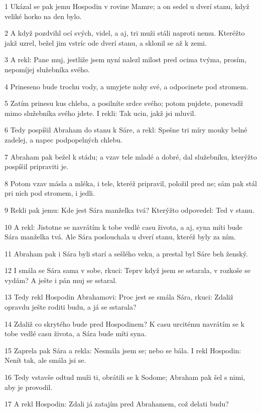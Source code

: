 \par 1 Ukázal se pak jemu Hospodin v rovine Mamre; a on sedel u dverí stanu, když veliké horko na den bylo.
\par 2 A když pozdvihl ocí svých, videl, a aj, tri muži stáli naproti nemu. Kteréžto jakž uzrel, bežel jim vstríc ode dverí stanu, a sklonil se až k zemi.
\par 3 A rekl: Pane muj, jestliže jsem nyní nalezl milost pred ocima tvýma, prosím, nepomíjej služebníka svého.
\par 4 Prineseno bude trochu vody, a umyjete nohy své, a odpocinete pod stromem.
\par 5 Zatím prinesu kus chleba, a posilníte srdce svého; potom pujdete, ponevadž mimo služebníka svého jdete. I rekli: Tak ucin, jakž jsi mluvil.
\par 6 Tedy pospíšil Abraham do stanu k Sáre, a rekl: Spešne tri míry mouky belné zadelej, a napec podpopelných chlebu.
\par 7 Abraham pak bežel k stádu; a vzav tele mladé a dobré, dal služebníku, kterýžto pospíšil pripraviti je.
\par 8 Potom vzav másla a mléka, i tele, kteréž pripravil, položil pred ne; sám pak stál pri nich pod stromem, i jedli.
\par 9 Rekli pak jemu: Kde jest Sára manželka tvá? Kterýžto odpovedel: Ted v stanu.
\par 10 A rekl: Jistotne se navrátím k tobe vedlé casu života, a aj, syna míti bude Sára manželka tvá. Ale Sára poslouchala u dverí stanu, kteréž byly za ním.
\par 11 Abraham pak i Sára byli starí a sešlého veku, a prestal byl Sáre beh ženský.
\par 12 I smála se Sára sama v sobe, rkuci: Teprv když jsem se sstarala, v rozkoše se vydám? A ješte i pán muj se sstaral.
\par 13 Tedy rekl Hospodin Abrahamovi: Proc jest se smála Sára, rkuci: Zdaliž opravdu ješte roditi budu, a já se sstarala?
\par 14 Zdaliž co skrytého bude pred Hospodinem? K casu urcitému navrátím se k tobe vedlé casu života, a Sára bude míti syna.
\par 15 Zaprela pak Sára a rekla: Nesmála jsem se; nebo se bála. I rekl Hospodin: Nenít tak, ale smála jsi se.
\par 16 Tedy vstavše odtud muži ti, obrátili se k Sodome; Abraham pak šel s nimi, aby je provodil.
\par 17 A rekl Hospodin: Zdali já zatajím pred Abrahamem, což delati budu?

